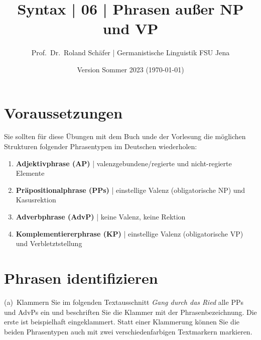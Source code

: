 \documentclass[12pt,a4paper,twoside]{article}
\author{Prof.\ Dr.\ Roland Schäfer | Germanistische Linguistik FSU Jena}
\title{Syntax | 06 | Phrasen außer NP und VP}
\date{Version Sommer 2023 (\today)}
\newcommand{\Lf}{
  \setlength{\itemsep}{1pt}
  \setlength{\parskip}{0pt}
  \setlength{\parsep}{0pt}
}
\begin{document}
\maketitle

\section*{Voraussetzungen}

Sie sollten für diese Übungen mit dem Buch unde der Vorlesung die möglichen Strukturen folgender Phrasentypen im Deutschen wiederholen:

\begin{enumerate}\Lf
  \item \textbf{Adjektivphrase (AP)} | valenzgebundene\slash regierte und nicht-regierte Elemente
  \item \textbf{Präpositionalphrase (PPs)} | einstellige Valenz (obligatorische NP) und Kasusrektion
  \item \textbf{Adverbphrase (AdvP)} | keine Valenz, keine Rektion
  \item \textbf{Komplementiererphrase (KP)} | einstellige Valenz (obligatorische VP) und Verbletztstellung
\end{enumerate}

\section{Phrasen identifizieren}\label{sec:erkennen}

(a)~Klammern Sie im folgenden Textausschnitt \textit{Gang durch das Ried} alle PPs und AdvPs ein und beschriften Sie die Klammer mit der Phrasenbezeichnung.
Die erste ist beispielhaft eingeklammert.
Statt einer Klammerung können Sie die beiden Phrasentypen auch mit zwei verschiedenfarbigen Textmarkern markieren.
\end{document}
